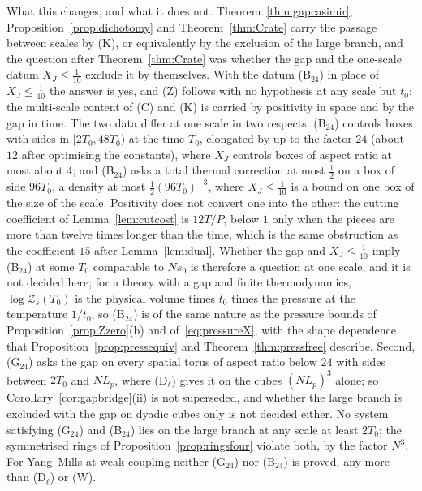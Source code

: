 What this changes, and what it does not. Theorem~\ref{thm:gapcasimir},
Proposition~\ref{prop:dichotomy} and Theorem~\ref{thm:Crate} carry the
passage between scales by (K), or equivalently by the exclusion of the
large branch, and the question after Theorem~\ref{thm:Crate} was whether
the gap and the one-scale datum $X_J\le\frac1{10}$ exclude it by
themselves. With the datum (B$_{24}$) in place of $X_J\le\frac1{10}$ the
answer is yes, and (Z) follows with no hypothesis at any scale but $t_0$:
the multi-scale content of (C) and (K) is carried by positivity in space
and by the gap in time. The two data differ at one scale in two respects.
(B$_{24}$) controls boxes with sides in $[2T_0,48T_0)$ at the time $T_0$,
elongated by up to the factor $24$ (about $12$ after optimising the
constants), where $X_J$ controls boxes of aspect ratio at most about $4$;
and (B$_{24}$) asks a total thermal correction at most $\frac12$ on a box of
side $96T_0$, a density at most $\frac12(96T_0)^{-3}$, where $X_J\le\frac1
{10}$ is a bound on one box of the size of the scale. Positivity does not
convert one into the other: the cutting coefficient of
Lemma~\ref{lem:cutcost} is $12T/P$, below $1$ only when the pieces are more
than twelve times longer than the time, which is the same obstruction as the
coefficient $15$ after Lemma~\ref{lem:dual}. Whether the gap and $X_J\le
\frac1{10}$ imply (B$_{24}$) at some $T_0$ comparable to $Ns_0$ is therefore
a question at one scale, and it is not decided here; for a theory with a
gap and finite thermodynamics, $\log\mathcal Z_s(T_0)$ is the physical volume
times $t_0$ times the pressure at the temperature $1/t_0$, so (B$_{24}$) is
of the same nature as the pressure bounds of
Proposition~\ref{prop:Zzero}(b) and of~\eqref{eq:pressureX}, with the
shape dependence that Proposition~\ref{prop:pressequiv} and
Theorem~\ref{thm:pressfree} describe. Second, (G$_{24}$) asks the gap on
every spatial torus of aspect ratio below $24$ with sides between $2T_0$ and
$NL_p$, where (D$_\ell$) gives it on the cubes $(NL_p)^3$ alone; so
Corollary~\ref{cor:gapbridge}(ii) is not superseded, and whether the large
branch is excluded with the gap on dyadic cubes only is not decided either.
No system satisfying (G$_{24}$) and (B$_{24}$) lies on the large branch at
any scale at least $2T_0$; the symmetrised rings of
Proposition~\ref{prop:ringsfour} violate both, by the factor $N^3$. For
Yang--Mills at weak coupling neither (G$_{24}$) nor (B$_{24}$) is proved, any
more than (D$_\ell$) or (W).
